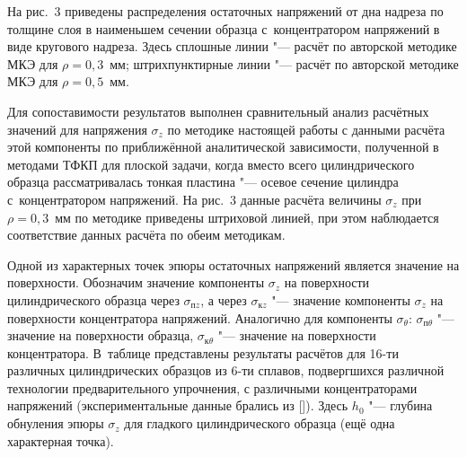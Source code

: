 На рис.~3 приведены распределения остаточных напряжений от дна надреза по толщине слоя в наименьшем сечении образца с~концентратором напряжений в виде кругового надреза. Здесь сплошные линии "--- расчёт по авторской методике МКЭ для $\rho=0,3$~мм; 
штрихпунктирные линии "--- расчёт по авторской методике МКЭ для $\rho=0,5$~мм.

Для сопоставимости результатов выполнен сравнительный анализ расчётных значений для напряжения $\sigma_z $ по методике настоящей работы с данными расчёта этой компоненты по приближённой аналитической зависимости, полученной в~\cite{IvaShaPavl73} методами ТФКП для плоской задачи, когда вместо всего цилиндрического образца рассматривалась тонкая пластина "--- осевое сечение цилиндра с~концентратором напряжений.
На рис.~3 данные расчёта величины $\sigma_z $ при $\rho=0,3$~мм  по методике \cite{IvaShaPavl73, PavKirIva08} приведены штриховой линией, при этом наблюдается соответствие данных расчёта по обеим методикам.

Одной из характерных точек эпюры остаточных напряжений является значение на поверхности.
Обозначим  значение компоненты $\sigma_z$ на поверхности цилиндрического образца через $\sigma_{\text{п} z}$, а через
$\sigma_{\text{к} z}$ "--- значение компоненты $\sigma_z$ на поверхности концентратора напряжений.
Аналогично для компоненты $\sigma_\theta$: $\sigma_{\text{п} \theta}$ "--- значение на поверхности образца,
$\sigma_{\text{к} \theta}$ "--- значение на поверхности концентратора.
В~таблице представлены результаты расчётов для 16-ти различных цилиндрических образцов из 6-ти сплавов, подвергшихся различной технологии предварительного упрочнения, с различными концентраторами напряжений (экспериментальные данные брались из []). 
Здесь $h_0$ "--- глубина  обнуления эпюры $\sigma_z$ для гладкого цилиндрического образца (ещё одна характерная точка).

